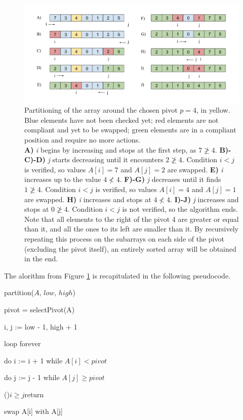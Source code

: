\documentclass[]{finalproject}
\begin{document}
\begin{figure}[H]
  \begin{center}
   \includegraphics[scale=0.5]{img/pivot_partitioning.png}
  \end{center}
  \caption{Partitioning of the array around the chosen pivot $p=4$, in yellow.
  Blue elements have not been checked yet; red elements are not compliant and yet to be swapped; green elements are in a compliant position and require no more actions. \\
  \textbf{A)} \textit{i} begins by increasing and stops at the first step, as $7 \ngeq 4$.
  \textbf{B)-C)-D)} \textit{j} starts decreasing until it encounters $2 \ngeq 4$. Condition $i<j$ is verified, so values $A[i]=7$ and $A[j]=2$ are swapped.
  \textbf{E)} \textit{i} increases up to the value $4 \nless 4$.
  \textbf{F)-G)} \textit{j} decreases until it finds $1 \ngeq 4$. Condition $i<j$ is verified, so values $A[i]=4$ and $A[j]=1$ are swapped.
  \textbf{H)} \textit{i} increases and stops at $4 \nless 4$.
  \textbf{I)-J)} \textit{j} increases and stops at $0 \ngeq 4$. Condition $i<j$ is not verified, so the algorithm ends. \\
  Note that all elements to the right of the pivot 4 are greater or equal than it, and all the ones to its left are smaller than it.
  By recursively repeating this process on the subarrays on each side of the pivot (excluding the pivot itself), an entirely sorted array will be obtained in the end.}
\label{fig:rec-part2}
\end{figure}

The alorithm from Figure \ref{fig:rec-part2} is recapitulated in the following pseudocode.

\begin{algorithm}
	\caption{partition($A$, $low$, $high$)}
	\label{alg:p2}
	
	pivot = selectPivot(A)
	
	i, j := low - 1, high + 1
	
	loop forever
	
	\Indp
	
	do i := i + 1 while $A[i] < pivot$
	
	do j := j - 1 while $A[j] \geq pivot$
	
	\If(){$i \geq j$}{return}
	
	swap A[i] with A[j]

\end{algorithm}
\end{document}
